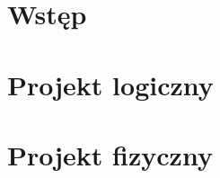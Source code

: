\documentclass[12pt]{article} %
\author{Miłosz Mosur}
\author{Mateusz Ossowski}
\author{Maciej Ratajski}
\begin{document}
	\tableofcontents
	
	\newpage
	\section{Wstęp}
		
	\section{Projekt logiczny}
		
	\newpage
	\section{Projekt fizyczny}
		
	\newpage
	\clearpage
	
	
\end{document}
